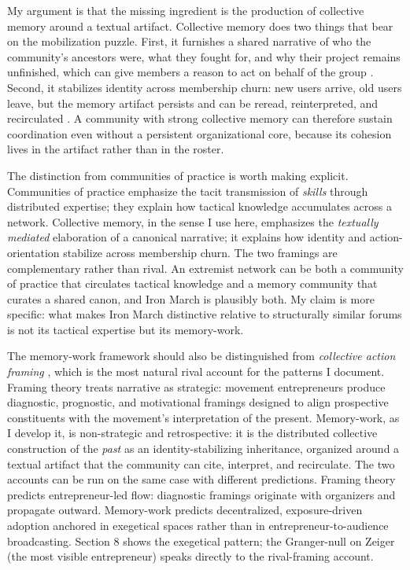 \documentclass[bibtex,autowc,nonblind]{apsr_submission}
\begin{document}
My argument is that the missing ingredient is the production of collective memory around a textual artifact. Collective memory does two things that bear on the mobilization puzzle. First, it furnishes a shared narrative of who the community's ancestors were, what they fought for, and why their project remains unfinished, which can give members a reason to act on behalf of the group \citep{polletta1998contending, zamponi2013collective}. Second, it stabilizes identity across membership churn: new users arrive, old users leave, but the memory artifact persists and can be reread, reinterpreted, and recirculated \citep{hoskins2018memory, lundstrom2022temporal}. A community with strong collective memory can therefore sustain coordination even without a persistent organizational core, because its cohesion lives in the artifact rather than in the roster.

The distinction from communities of practice is worth making explicit. Communities of practice emphasize the tacit transmission of \textit{skills} through distributed expertise; they explain how tactical knowledge accumulates across a network. Collective memory, in the sense I use here, emphasizes the \textit{textually mediated} elaboration of a canonical narrative; it explains how identity and action-orientation stabilize across membership churn. The two framings are complementary rather than rival. An extremist network can be both a community of practice that circulates tactical knowledge and a memory community that curates a shared canon, and Iron March is plausibly both. My claim is more specific: what makes Iron March distinctive relative to structurally similar forums is not its tactical expertise but its memory-work.

The memory-work framework should also be distinguished from \textit{collective action framing} \citep{benford2000framing, snow1986frame, gamson1992talking}, which is the most natural rival account for the patterns I document. Framing theory treats narrative as strategic: movement entrepreneurs produce diagnostic, prognostic, and motivational framings designed to align prospective constituents with the movement's interpretation of the present. Memory-work, as I develop it, is non-strategic and retrospective: it is the distributed collective construction of the \textit{past} as an identity-stabilizing inheritance, organized around a textual artifact that the community can cite, interpret, and recirculate. The two accounts can be run on the same case with different predictions. Framing theory predicts entrepreneur-led flow: diagnostic framings originate with organizers and propagate outward. Memory-work predicts decentralized, exposure-driven adoption anchored in exegetical spaces rather than in entrepreneur-to-audience broadcasting. Section 8 shows the exegetical pattern; the Granger-null on Zeiger (the most visible entrepreneur) speaks directly to the rival-framing account.
\end{document}
